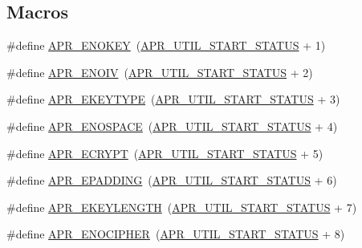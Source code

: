 \subsection*{Macros}
\begin{DoxyCompactItemize}
\item 
\#define \hyperlink{group__APR__Util__Error_gabf9bbd463ebcf38611f6acd423e49de9}{A\+P\+R\+\_\+\+E\+N\+O\+K\+EY}~(\hyperlink{group__apr__errno_gadf26297a72afa0ea224e7097fe59a1cd}{A\+P\+R\+\_\+\+U\+T\+I\+L\+\_\+\+S\+T\+A\+R\+T\+\_\+\+S\+T\+A\+T\+US} + 1)
\item 
\#define \hyperlink{group__APR__Util__Error_ga2df3db3a80a6e153134caf5d3a62a00f}{A\+P\+R\+\_\+\+E\+N\+O\+IV}~(\hyperlink{group__apr__errno_gadf26297a72afa0ea224e7097fe59a1cd}{A\+P\+R\+\_\+\+U\+T\+I\+L\+\_\+\+S\+T\+A\+R\+T\+\_\+\+S\+T\+A\+T\+US} + 2)
\item 
\#define \hyperlink{group__APR__Util__Error_ga637727cdf8285d12663ddf8bb89fa048}{A\+P\+R\+\_\+\+E\+K\+E\+Y\+T\+Y\+PE}~(\hyperlink{group__apr__errno_gadf26297a72afa0ea224e7097fe59a1cd}{A\+P\+R\+\_\+\+U\+T\+I\+L\+\_\+\+S\+T\+A\+R\+T\+\_\+\+S\+T\+A\+T\+US} + 3)
\item 
\#define \hyperlink{group__APR__Util__Error_gaec7a912cf8fe5f964ad8fbbafaff0241}{A\+P\+R\+\_\+\+E\+N\+O\+S\+P\+A\+CE}~(\hyperlink{group__apr__errno_gadf26297a72afa0ea224e7097fe59a1cd}{A\+P\+R\+\_\+\+U\+T\+I\+L\+\_\+\+S\+T\+A\+R\+T\+\_\+\+S\+T\+A\+T\+US} + 4)
\item 
\#define \hyperlink{group__APR__Util__Error_ga2e98ff79515dfd5a21583d09c300d9bb}{A\+P\+R\+\_\+\+E\+C\+R\+Y\+PT}~(\hyperlink{group__apr__errno_gadf26297a72afa0ea224e7097fe59a1cd}{A\+P\+R\+\_\+\+U\+T\+I\+L\+\_\+\+S\+T\+A\+R\+T\+\_\+\+S\+T\+A\+T\+US} + 5)
\item 
\#define \hyperlink{group__APR__Util__Error_gae7c077d0539cafc19917c12174ed961d}{A\+P\+R\+\_\+\+E\+P\+A\+D\+D\+I\+NG}~(\hyperlink{group__apr__errno_gadf26297a72afa0ea224e7097fe59a1cd}{A\+P\+R\+\_\+\+U\+T\+I\+L\+\_\+\+S\+T\+A\+R\+T\+\_\+\+S\+T\+A\+T\+US} + 6)
\item 
\#define \hyperlink{group__APR__Util__Error_gabc3c0dcf5954c161df4aff0fb0ce3ae4}{A\+P\+R\+\_\+\+E\+K\+E\+Y\+L\+E\+N\+G\+TH}~(\hyperlink{group__apr__errno_gadf26297a72afa0ea224e7097fe59a1cd}{A\+P\+R\+\_\+\+U\+T\+I\+L\+\_\+\+S\+T\+A\+R\+T\+\_\+\+S\+T\+A\+T\+US} + 7)
\item 
\#define \hyperlink{group__APR__Util__Error_ga6b546475980180206e4286e35befaf55}{A\+P\+R\+\_\+\+E\+N\+O\+C\+I\+P\+H\+ER}~(\hyperlink{group__apr__errno_gadf26297a72afa0ea224e7097fe59a1cd}{A\+P\+R\+\_\+\+U\+T\+I\+L\+\_\+\+S\+T\+A\+R\+T\+\_\+\+S\+T\+A\+T\+US} + 8)

\end{DoxyCompactItemize}

